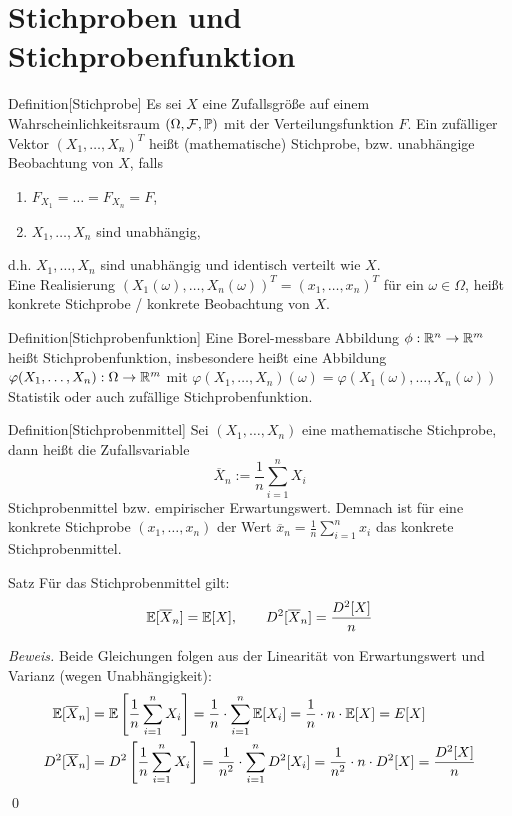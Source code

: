 
\newpage
\section{Stichproben und Stichprobenfunktion}

\begin{colbox}{Definition}[Stichprobe]
    Es sei $X$ eine Zufallsgröße auf einem Wahrscheinlichkeitsraum $(\Omega,\mathcal{F}, \P)$ mit der 
    Verteilungsfunktion $F$. Ein zufälliger Vektor $(X_1,\dots,X_n)^T$ heißt (mathematische) Stichprobe, bzw. unabhängige Beobachtung
    von $X$, falls 
    \begin{enumerate}
        \item $F_{X_1}=\dots=F_{X_n}=F$,
        \item $X_1,\dots,X_n$ sind unabhängig,
    \end{enumerate}
    d.h. $X_1,\dots,X_n$ sind unabhängig und identisch verteilt wie $X$. \\
    Eine Realisierung $(X_1(\omega),\dots,X_n(\omega))^T=(x_1,\dots,x_n)^T$ für ein $\omega\in\Omega$, heißt 
    konkrete Stichprobe / konkrete Beobachtung von $X$.
\end{colbox}

\begin{colbox}{Definition}[Stichprobenfunktion]
    Eine Borel-messbare Abbildung $\phi:\R^n\to\R^m$ heißt Stichprobenfunktion, insbesondere heißt eine 
    Abbildung $\varphi(X_1,\dots,X_n):\Omega\to\R^m$ mit 
    $\varphi(X_1,\dots,X_n)(\omega) = \varphi(X_1(\omega), \dots,X_n(\omega))$ Statistik oder auch zufällige
    Stichprobenfunktion.
\end{colbox}

\begin{colbox}{Definition}[Stichprobenmittel]
    Sei $(X_1,\dots,X_n)$ eine mathematische Stichprobe, dann heißt die Zufallsvariable 
    \[
        \overline{X}_n := \dfrac{1}{n}\sum_{i=1}^{n} X_i
    \]
    Stichprobenmittel bzw. empirischer Erwartungswert. Demnach ist für eine konkrete Stichprobe $(x_1,\dots,x_n)$ der 
    Wert $\overline{x}_n = \tfrac{1}{n}\sum_{i=1}^{n}x_i$ das konkrete Stichprobenmittel.
\end{colbox}

\begin{colbox}{Satz}
    Für das Stichprobenmittel gilt:
    \[
        \E[\overline{X}_n] = \E[X], \qquad D^2[\overline{X}_n] = \dfrac{D^2[X]}{n}
    \]
\end{colbox}
\textit{Beweis.} Beide Gleichungen folgen aus der Linearität von Erwartungswert und Varianz (wegen Unabhängigkeit):
\begin{align*}
    \E[\overline{X}_n] 
    &= \E\left[\dfrac{1}{n}\sum_{i=1}^{n} X_i\right] 
    = \dfrac{1}{n}\cdot\sum_{i=1}^{n}\E[X_i] 
    = \dfrac{1}{n}\cdot n\cdot\E[X]
    = E[X] \\
    D^2[\overline{X}_n] 
    &= D^2\left[\dfrac{1}{n}\sum_{i=1}^{n} X_i\right]
    = \dfrac{1}{n^2}\cdot\sum_{i=1}^{n}D^2[X_i]
    = \dfrac{1}{n^2}\cdot n\cdot D^2[X]
    = \dfrac{D^2[X]}{n}
\end{align*}
\qed

